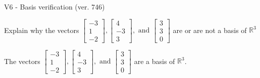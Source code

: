 \begin{exercise}
  \begin{exerciseTitle}V6 - Basis verification (ver. 746)\end{exerciseTitle}
  \begin{exerciseStatement}
    Explain why the vectors \(\left[\begin{array}{r}
-3 \\
1 \\
-2
\end{array}\right] , \left[\begin{array}{r}
4 \\
-3 \\
3
\end{array}\right] , \text{ and } \left[\begin{array}{r}
3 \\
3 \\
0
\end{array}\right]\) are or are not a basis of \(\mathbb{R}^3\)	


  \end{exerciseStatement}
  \begin{exerciseAnswer}
   The vectors \(\left[\begin{array}{r}
-3 \\
1 \\
-2
\end{array}\right] , \left[\begin{array}{r}
4 \\
-3 \\
3
\end{array}\right] , \text{ and } \left[\begin{array}{r}
3 \\
3 \\
0
\end{array}\right]\) 
  	 are  a basis of \(\mathbb{R}^3\).
  


  \end{exerciseAnswer}
\end{exercise}
